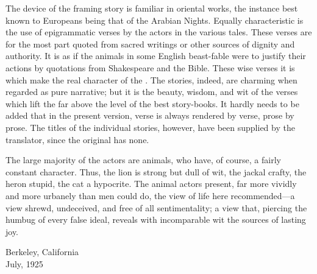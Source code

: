 The device of the framing story is familiar in oriental works, the
instance best known to Europeans being that of the Arabian
Nights. Equally characteristic is the use of epigrammatic verses by
the actors in the various tales. These verses are for the most part
quoted from sacred writings or other sources of dignity and
authority. It is as if the animals in some English beast-fable were to
justify their actions by quotations from Shakespeare and the
Bible. These wise verses it is which make the real character of the
. The stories, indeed, are charming when regarded as pure
narrative; but it is the beauty, wisdom, and wit of the verses which
lift the  far above the level of the best story-books.  It
hardly needs to be added that in the present version, verse is always
rendered by verse, prose by prose. The titles of the individual
stories, however, have been supplied by the translator, since the
original has none.

The large majority of the actors are animals, who have, of course, a
fairly constant character. Thus, the lion is strong but dull of wit,
the jackal crafty, the heron stupid, the cat a hypocrite. The animal
actors present, far more vividly and more urbanely than men could do,
the view of life here recommended---a view shrewd, undeceived, and
free of all sentimentality; a view that, piercing the humbug of every
false ideal, reveals with incomparable wit the sources of lasting joy.

\noindent
\parbox{7in}{
Berkeley, California\\
July, 1925
}




